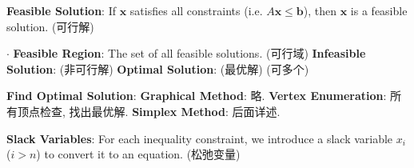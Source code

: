 \documentclass[9pt]{article}
\begin{document}
\vspace{-15pt}
\textbf{Feasible Solution}: If $\mathbf{x}$ satisfies all constraints (i.e. $A\mathbf{x}\leq\mathbf{b}$), then $\mathbf{x}$ is a feasible solution. {\footnotesize (可行解)}

$\cdot$ \textbf{Feasible Region}: The set of all feasible solutions. {\footnotesize (可行域)} \quad \textbf{Infeasible Solution}: {\footnotesize (非可行解)} \quad \textbf{Optimal Solution}: {\footnotesize (最优解) (可多个)}

\textbf{Find Optimal Solution}: \textbf{Graphical Method}: {\footnotesize 略.} \quad \textbf{Vertex Enumeration}: {\footnotesize 所有顶点检查, 找出最优解.} \quad \textbf{Simplex Method}: {\footnotesize 后面详述.}

\textbf{Slack Variables}: For each inequality constraint, we introduce a slack variable $x_i$ ($i>n$) to convert it to an equation. {\footnotesize (松弛变量)}
\end{document}
